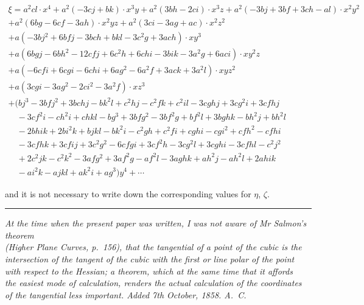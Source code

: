 \documentclass[11pt,a4paper]{article}
\begin{document}
\small
\begin{multline*}
\xi = a^2cl\cdot x^4 + a^2(-3cj+bk)\cdot x^3y + a^2(3bh-2ci)\cdot x^3z + a^2(-3bj+3bf+3ch-al)\cdot x^2y^2 \\
+ a^2(6bg-6cf-3ah)\cdot x^2yz + a^2(3ci-3ag+ac)\cdot x^2z^2 \\
+ a(-3bj^2+6bfj-3bch+bkl-3c^2g+3ach)\cdot xy^3 \\
+ a(6bgj-6bh^2-12cfj+6c^2h+6chi-3bik-3a^2g+6aci)\cdot xy^2z \\
+ a(-6cfi+6cgi-6chi+6ag^2-6a^2f+3ack+3a^2l)\cdot xyz^2 \\
+ a(3cgi-3ag^2-2ci^2-3a^2f)\cdot xz^3 \\
+ (bj^3-3bfj^2+3bchj-bk^2l+c^2hj-c^2fk+c^2il-3cghj+3cg^2i+3cfhj \\
\quad -3cf^2i-ch^2i+chkl-bg^3+3bfg^2-3bf^2g+bf^2l+3bghk-bh^2j+bh^2l \\
\quad -2bhik+2bi^2k+bjkl-bk^2i-c^2gh+c^2fi+cghi-cgi^2+cfh^2-cfhi \\
\quad -3cfhk+3cfij+3c^2g^2-6cfgi+3cf^2h-3cg^2l+3cghi-3cfhl-c^2j^2 \\
\quad +2c^2jk-c^2k^2-3afg^2+3af^2g-af^2l-3aghk+ah^2j-ah^2l+2ahik \\
\quad -ai^2k-ajkl+ak^2i+ag^3\bigr)y^4 + \cdots
\end{multline*}
\normalsize

and it is not necessary to write down the corresponding values for $\eta$, $\zeta$.

\vspace{1em}
\noindent\rule{0.3\textwidth}{0.4pt}
\begin{flushright}
\textit{At the time when the present paper was written, I was not aware of Mr Salmon's theorem}\\
\textit{(Higher Plane Curves, p.~156), that the tangential of a point of the cubic is the}\\
\textit{intersection of the tangent of the cubic with the first or line polar of the point}\\
\textit{with respect to the Hessian; a theorem, which at the same time that it affords}\\
\textit{the easiest mode of calculation, renders the actual calculation of the coordinates}\\
\textit{of the tangential less important. Added 7th October, 1858. A.~C.}
\end{flushright}

\newpage
\end{document}
